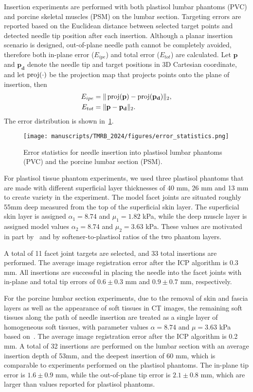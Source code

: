 Insertion experiments are performed with both plastisol lumbar phantoms (PVC) and porcine skeletal muscles (PSM) on the lumbar section. Targeting errors are reported based on the Euclidean distance between selected target points and  detected needle tip position after each insertion. Although a planar insertion scenario is designed, out-of-plane needle path cannot be completely avoided, therefore both in-plane error ($E_{ipe}$) and total error ($E_{tot}$) are calculated. Let $\mathbf{p}$ and $\mathbf{p_d}$ denote the needle tip and target positions in 3D Cartesian coordinate, and let $\operatorname{proj}(\cdot)$ be the projection map that projects points onto the plane of insertion, then 
\begin{align}
  E_{ipe} &= \Vert\operatorname{proj}(\mathbf{p}) - \operatorname{proj}(\mathbf{p_d}) \Vert_2, \\ 
  E_{tot} &= \Vert \mathbf{p} - \mathbf{p_d}\Vert_2.
\end{align}
The error distribution is shown in~\cref{fig:chap-3-error-statistics}.

\begin{figure}[!h]
  \centering
  \texttt{[image: manuscripts/TMRB\_2024/figures/error\_statistics.png]}
  \caption{Error statistics for needle insertion into plastisol lumbar phantoms (PVC) and the porcine lumbar section (PSM).}
  \label{fig:chap-3-error-statistics}
\end{figure}

For plastisol tissue phantom experiments, we used three plastisol phantoms that are made with different superficial layer thicknesses of 40 mm, 26 mm and 13 mm to create variety in the experiment. The model facet joints are situated roughly 55mm deep measured from the top of the superficial skin layer. The superficial skin layer is assigned $\alpha_1 = 8.74$ and $\mu_1 = 1.82$ kPa, while the deep muscle layer is assigned model values $\alpha_2 = 8.74$ and $\mu_2 = 3.63$ kPa. These values are motivated in part by~\parencite{moVitroCompressiveProperties2020} and by softener-to-plastisol ratios of the two phantom layers.

A total of 11 facet joint targets are selected, and 33 total insertions are performed. The average image registration error after the ICP algorithm is 0.3 mm. All insertions are successful in placing the needle into the facet joints with in-plane and total tip errors of $0.6 \pm 0.3$ mm and $0.9 \pm 0.7$ mm, respectively. 

For the porcine lumbar section experiments, due to the removal of skin and fascia layers as well as the appearance of soft tissues in CT images, the remaining soft tissues along the path of needle insertion are treated as a single layer of homogeneous soft tissues, with parameter values $\alpha = 8.74$ and $\mu = 3.63$ kPa based on~\parencite{moVitroCompressiveProperties2020}. The average image registration error after the ICP algorithm is 0.2 mm. A total of 32 insertions are performed on the lumbar section with an average insertion depth of 53mm, and the deepest insertion of 60 mm, which is comparable to experiments performed on the plastisol phantoms. The in-plane tip error is $1.6 \pm 0.9$ mm, while the out-of-plane tip error is $2.1 \pm 0.8$ mm, which are larger than values reported for plastisol phantoms.

